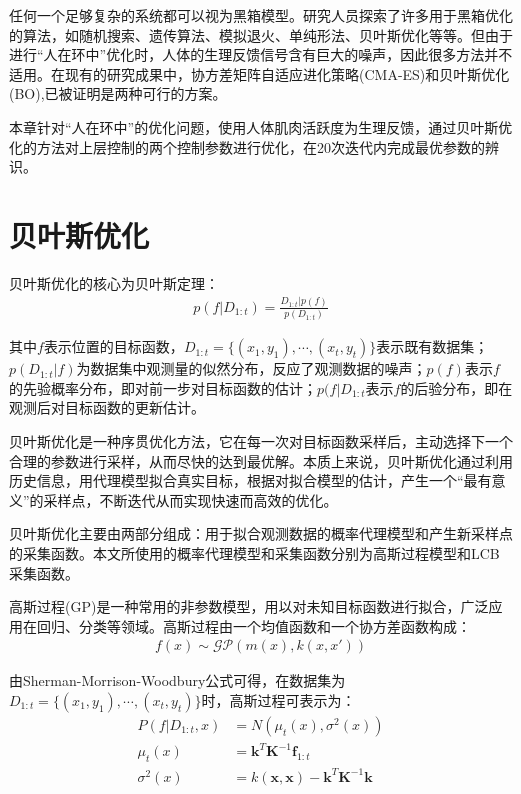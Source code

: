 任何一个足够复杂的系统都可以视为黑箱模型。研究人员探索了许多用于黑箱优化的算法\cite{p48}，如随机搜索、遗传算法、模拟退火、单纯形法、贝叶斯优化等等。但由于进行“人在环中”优化时，人体的生理反馈信号含有巨大的噪声，因此很多方法并不适用。在现有的研究成果中，协方差矩阵自适应进化策略\cite{p40}(CMA-ES)和贝叶斯优化\cite{p41}(BO),已被证明是两种可行的方案。

本章针对“人在环中”的优化问题，使用人体肌肉活跃度为生理反馈，通过贝叶斯优化的方法对上层控制的两个控制参数进行优化，在20次迭代内完成最优参数的辨识。

\section{贝叶斯优化}

贝叶斯优化的核心为贝叶斯定理：
\begin{align}
    p(f|D_{1:t})=\frac{D_{1:t}|p(f)}{p(D_{1:t})}
\end{align}

其中$f$表示位置的目标函数，$D_{1:t} = \{(x_1,y_1),\cdots,(x_t,y_t)\}$表示既有数据集；$p(D_{1:t}|f)$为数据集中观测量的似然分布，反应了观测数据的噪声；$p(f)$表示$f$的先验概率分布，即对前一步对目标函数的估计；$p(f|D_{1:t}$表示$f$的后验分布，即在观测后对目标函数的更新估计。

贝叶斯优化是一种序贯优化方法，它在每一次对目标函数采样后，主动选择下一个合理的参数进行采样，从而尽快的达到最优解。本质上来说，贝叶斯优化通过利用历史信息，用代理模型拟合真实目标，根据对拟合模型的估计，产生一个“最有意义”的采样点，不断迭代从而实现快速而高效的优化。

贝叶斯优化主要由两部分组成：用于拟合观测数据的概率代理模型和产生新采样点的采集函数。本文所使用的概率代理模型和采集函数分别为高斯过程模型和LCB采集函数。

高斯过程(GP)是一种常用的非参数模型，用以对未知目标函数进行拟合，广泛应用在回归、分类等领域。高斯过程由一个均值函数和一个协方差函数构成：
\begin{align}
    f(x)\sim \mathcal{GP}(m(x),k(x,x'))
\end{align}

由Sherman-Morrison-Woodbury公式\cite{p49}可得，在数据集为$D_{1:t} = \{(x_1,y_1),\cdots,(x_t,y_t)\}$时，高斯过程可表示为：
\begin{align}
    P(f|D_{1:t},x) &= N(\mu_t(x),\sigma^2(x)) \\
    \mu_t(x) &= \mathbf{k}^T\mathbf{K}^{-1}\mathbf{f}_{1:t} \\
    \sigma^2(x) &= k(\mathbf{x},\mathbf{x}) - \mathbf{k}^T\mathbf{K}^{-1}\mathbf{k}
\end{align}


